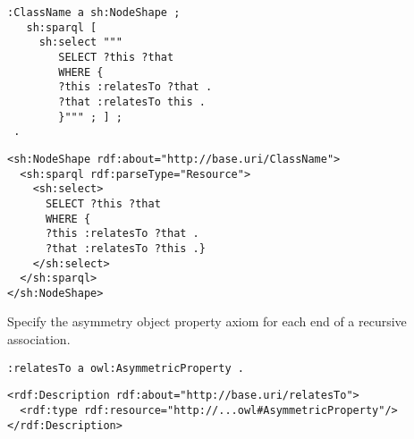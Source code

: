 \vspace{-\parskip}
\begin{minipage}[b]{.385\textwidth}
\begin{lstlisting}[language=Turtle, caption={Declaring an asymmetric property in Turtle syntax}, captionpos=b]
 :ClassName a sh:NodeShape ;
   sh:sparql [
     sh:select """
        SELECT ?this ?that
        WHERE {
        ?this :relatesTo ?that .
        ?that :relatesTo this .
        }""" ; ] ;
 .
\end{lstlisting}
\end{minipage}%
\quad\vspace{-\parskip}
\begin{minipage}[b]{.55\textwidth}
\begin{lstlisting}[language=RDF/XML, caption={Declaring an asymmetric property in RDF/XML syntax}, captionpos=b]
<sh:NodeShape rdf:about="http://base.uri/ClassName">
  <sh:sparql rdf:parseType="Resource">
    <sh:select>
      SELECT ?this ?that
      WHERE {
      ?this :relatesTo ?that .
      ?that :relatesTo ?this .}
    </sh:select>
  </sh:sparql>
</sh:NodeShape>
\end{lstlisting}
\end{minipage}
\vspace{-\parskip}

\begin{trule}
	\label{rule:association-uni-asymetry-rc}
	Specify the asymmetry object property axiom for each end of a recursive association.
\end{trule}

\vspace{-\parskip}
\begin{minipage}[b]{.35\textwidth}
\begin{lstlisting}[language=Turtle, caption={Declaring an asymmetric property in Turtle syntax}, captionpos=b]
:relatesTo a owl:AsymmetricProperty .
\end{lstlisting}
\end{minipage}%
\quad\vspace{-\parskip}
\begin{minipage}[b]{.58\textwidth}
\begin{lstlisting}[language=RDF/XML, caption={Declaring an asymmetric property in RDF/XML syntax}, captionpos=b]
<rdf:Description rdf:about="http://base.uri/relatesTo">
  <rdf:type rdf:resource="http://...owl#AsymmetricProperty"/>
</rdf:Description>
\end{lstlisting}
\end{minipage}
\vspace{-\parskip}

